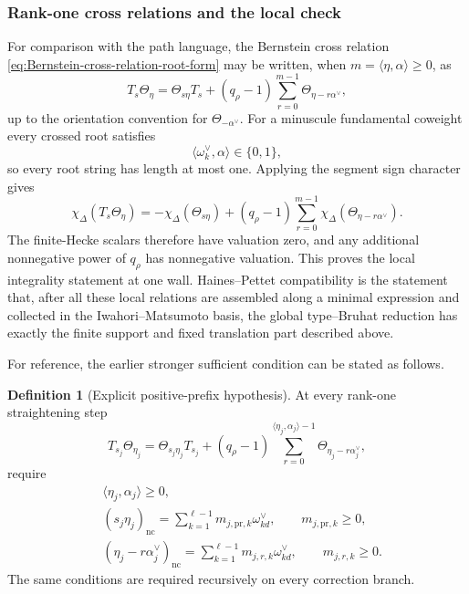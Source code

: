 \documentclass[12pt]{article}
\theoremstyle{definition}
\newtheorem{definition}[theorem]{Definition}
\theoremstyle{remark}
\begin{document}
\subsubsection{Rank-one cross relations and the local check}

For comparison with the path language, the Bernstein cross relation
\eqref{eq:Bernstein-cross-relation-root-form} may be written, when
\(m=\langle\eta,\alpha\rangle\geq0\), as
\begin{equation}\label{eq:rank-one-Bernstein-string}
 T_s\Theta_\eta
 =
 \Theta_{s\eta}T_s
 +(q_\rho-1)
 \sum_{r=0}^{m-1}\Theta_{\eta-r\alpha^\vee},
\end{equation}
up to the orientation convention for \(\Theta_{-\alpha^\vee}\).
For a minuscule fundamental coweight every crossed root satisfies
\[
 \langle\omega_k^\vee,\alpha\rangle\in\{0,1\},
\]
so every root string has length at most one.  Applying the segment sign
character gives
\begin{equation}\label{eq:rank-one-after-sign-character}
 \chi_\Delta(T_s\Theta_\eta)
 =
 -\chi_\Delta(\Theta_{s\eta})
 +(q_\rho-1)
 \sum_{r=0}^{m-1}
 \chi_\Delta(\Theta_{\eta-r\alpha^\vee}).
\end{equation}
The finite-Hecke scalars therefore have valuation zero, and any additional
nonnegative power of \(q_\rho\) has nonnegative valuation.  This proves the
local integrality statement at one wall.  Haines--Pettet compatibility is
the statement that, after all these local relations are assembled along a
minimal expression and collected in the Iwahori--Matsumoto basis, the global
type--Bruhat reduction has exactly the finite support and fixed translation
part described above.

For reference, the earlier stronger sufficient condition can be stated as
follows.

\begin{definition}[Explicit positive-prefix hypothesis]
\label{def:explicit-positive-prefix-hypothesis}
At every rank-one straightening step
\[
 T_{s_j}\Theta_{\eta_j}
 =
 \Theta_{s_j\eta_j}T_{s_j}
 +(q_\rho-1)
 \sum_{r=0}^{\langle\eta_j,\alpha_j\rangle-1}
 \Theta_{\eta_j-r\alpha_j^\vee},
\]
require
\begin{align}
 &\langle\eta_j,\alpha_j\rangle\geq0,
 \label{eq:positive-prefix-pairing}\\
 &(s_j\eta_j)_{\mathrm{nc}}
 =
 \sum_{k=1}^{\ell-1}
 m_{j,\mathrm{pr},k}\omega_{kd}^\vee,
 \qquad
 m_{j,\mathrm{pr},k}\geq0,
 \label{eq:positive-prefix-principal}\\
 &(\eta_j-r\alpha_j^\vee)_{\mathrm{nc}}
 =
 \sum_{k=1}^{\ell-1}
 m_{j,r,k}\omega_{kd}^\vee,
 \qquad
 m_{j,r,k}\geq0.
 \label{eq:positive-prefix-corrections}
\end{align}
The same conditions are required recursively on every correction branch.
\end{definition}
\end{document}
